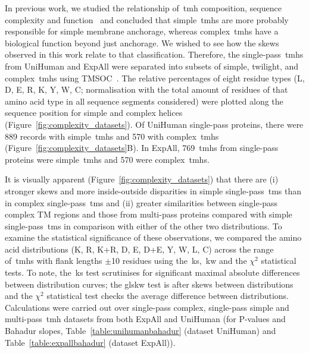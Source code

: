 In previous work, we studied the relationship of~\gls{tmh} composition, sequence complexity and function~\cite{Wong2010, Wong2011, Wong2012} and concluded that simple~\gls{tmh}s are more probably responsible for simple membrane anchorage, whereas complex~\gls{tmh}s have a biological function beyond just anchorage.
We wished to see how the skews observed in this work relate to that classification.
Therefore, the single-pass~\gls{tmh}s from UniHuman and ExpAll were separated into subsets of simple, twilight, and complex~\gls{tmh}s using TMSOC~\cite{Wong2011, Wong2012}.
The relative percentages of eight residue types (L, D, E, R, K, Y, W, C\@; normalisation with the total amount of residues of that amino acid type in all sequence segments considered) were plotted along the sequence position for simple and complex helices (Figure~\ref{fig:complexity_datasets}).
Of UniHuman single-pass proteins, there were 889 records with simple~\gls{tmh}s and 570 with complex~\gls{tmh}s (Figure~\ref{fig:complexity_datasets}B).
In ExpAll, 769~\gls{tmh}s from single-pass proteins were simple~\gls{tmh}s and 570 were complex~\gls{tmh}s.

It is visually apparent (Figure~\ref{fig:complexity_datasets}) that there are (i) stronger skews and more inside-outside disparities in simple single-pass~\gls{tm}s than in complex single-pass~\gls{tm}s and (ii) greater similarities between single-pass complex TM regions and those from multi-pass proteins compared with simple single-pass~\gls{tm}s in comparison with either of the other two distributions.
To examine the statistical significance of these observations, we compared the amino acid distributions (K, R, K+R, D, E, D+E, Y, W, L, C) across the range of~\gls{tmh}s with flank lengths $\pm$10 residues using the~\gls{ks},~\gls{kw} and the \({\chi}^{2}\) statistical tests.
To note, the~\gls{ks} test scrutinises for significant maximal absolute differences between distribution curves; the gls{kw} test is after skews between distributions and the \({\chi}^{2}\) statistical test checks the average difference between distributions.
Calculations were carried out over single-pass complex, single-pass simple and multi-pass~\gls{tmh} datasets from both ExpAll and UniHuman (for P\--values and Bahadur slopes, Table~\ref{table:unihumanbahadur} (dataset UniHuman) and Table~\ref{table:expallbahadur} (dataset ExpAll)).

